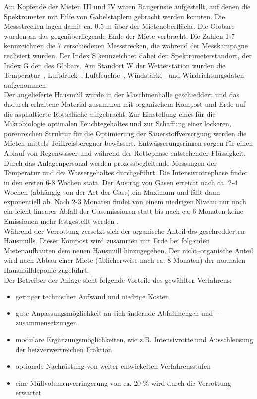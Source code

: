 Am Kopfende der Mieten III und IV waren Baugerüste aufgestellt,
auf denen die Spektrometer mit Hilfe von Gabelstaplern gebracht
werden konnten. Die Messstrecken lagen damit ca. 0.5 m über der
Mietenoberfläche. Die Globare wurden an das gegenüberliegende Ende
der Miete verbracht. Die Zahlen 1-7 kennzeichnen die 7
verschiedenen Messstrecken, die während der Messkampagne
realisiert wurden. Der Index S kennzeichnet dabei den
Spektrometerstandort, der Index G den des Globars. Am Standort W
der Wetterstation wurden die Temperatur--, Luftdruck--,
Luftfeuchte--, Windstärke-- und Windrichtungsdaten aufgenommen.\\

Der angelieferte Hausmüll wurde in der Maschinenhalle geschreddert
und das dadurch erhaltene Material zusammen mit organischem
Kompost und Erde auf die asphaltierte Rottefläche aufgebracht. Zur
Einstellung eines für die Mikrobiologie optimalen Feuchtegehaltes
und zur Schaffung einer lockeren, porenreichen Struktur für die
Optimierung der Sauerstoffversorgung werden die Mieten mittels
Teilkreisberegner bewässert. Entwässerungsrinnen sorgen für einen
Ablauf von Regenwasser und während der Rottephase entstehender
Flüssigkeit. Durch das Anlagenpersonal werden prozessbegleitende
Messungen der Temperatur und des Wassergehaltes durchgeführt. Die
Intensivrottephase findet in den ersten 6-8 Wochen statt. Der
Austrag von Gasen erreicht nach ca. 2-4 Wochen (abhängig von der
Art der Gase) ein Maximum und fällt dann exponentiell ab. Nach 2-3
Monaten findet von einem niedrigen Niveau nur noch ein leicht
linearer Abfall der Gasemissionen statt bis nach ca. 6 Monaten
keine Emissionen mehr festgestellt werden \cite{turk97}.\\

Während der Verrottung zersetzt sich der organische Anteil des
geschredderten Hausmülls. Dieser Kompost wird zusammen mit Erde
bei folgenden Mietenaufbauten dem neuen Hausmüll hinzugegeben. Der
nicht--organische Anteil wird nach Abbau einer Miete
(üblicherweise nach ca. 8 Monaten) der normalen Hausmülldeponie
zugeführt.\\

\noindent Der Betreiber der Anlage sieht folgende Vorteile des
gewählten Verfahrens:

\begin{itemize}

\item geringer technischer Aufwand und niedrige Kosten
\item gute Anpassungsmöglichkeit an sich ändernde Abfallmengen und
--zu\-samm\-en\-setz\-ung\-en
\item modulare Ergänzungsmöglichkeiten, wie z.B. Intensivrotte und
Ausschleusung der heizverwertreichen Fraktion
\item optionale Nachrüstung von weiter entwickelten
Verfahrensstufen
\item eine Müllvolumenverringerung von ca. 20 \% wird durch die
Verrottung erwartet

\end{itemize}


